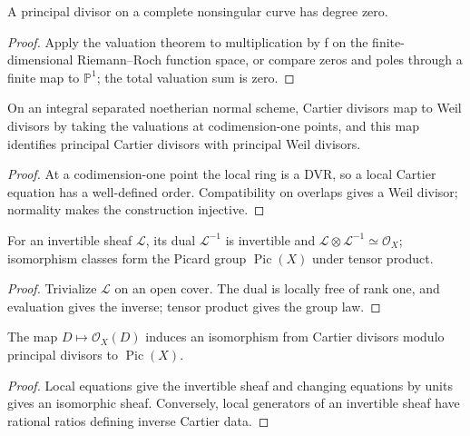 \begin{corollary}
\label{cor:II-6-10}
A principal divisor on a complete nonsingular curve has degree zero.
\end{corollary}
\begin{proof}
Apply the valuation theorem to multiplication by f on the finite-dimensional Riemann--Roch function
space, or compare zeros and poles through a finite map to $\mathbb P^1$; the total valuation sum is zero.
\end{proof}

\begin{proposition}
\label{prop:II-6-11}
On an integral separated noetherian normal scheme, Cartier divisors map to Weil divisors by taking
the valuations at codimension-one points, and this map identifies principal Cartier divisors with
principal Weil divisors.
\end{proposition}
\begin{proof}
At a codimension-one point the local ring is a DVR, so a local Cartier equation has a well-defined
order. Compatibility on overlaps gives a Weil divisor; normality makes the construction injective.
\end{proof}

\begin{proposition}
\label{prop:II-6-12}
For an invertible sheaf $\mathcal L$, its dual $\mathcal L^{-1}$ is invertible and
$\mathcal L\otimes\mathcal L^{-1}\simeq\mathcal O_X$; isomorphism classes form the Picard group
$\operatorname{Pic}(X)$ under tensor product.
\end{proposition}
\begin{proof}
Trivialize $\mathcal L$ on an open cover. The dual is locally free of rank one, and evaluation gives
the inverse; tensor product gives the group law.
\end{proof}

\begin{proposition}
\label{prop:II-6-13}
The map $D\mapsto\mathcal O_X(D)$ induces an isomorphism from Cartier divisors modulo principal
divisors to $\operatorname{Pic}(X)$.
\end{proposition}
\begin{proof}
Local equations give the invertible sheaf and changing equations by units gives an isomorphic sheaf.
Conversely, local generators of an invertible sheaf have rational ratios defining inverse Cartier data.
\end{proof}

